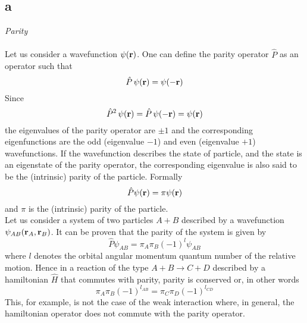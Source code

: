\subsection*{a} 

\vspace{10pt}
\emph{Parity} \\
\vspace{10pt} \\
Let us consider a wavefunction $\psi(\mathbf{r})$. One can define the parity operator $\hat P$ as an operator such that 
\begin{equation*}
    \hat P \, \psi(\mathbf{r}) = \psi(-\mathbf{r})
\end{equation*}
Since
\begin{equation}
    \hat P^2 \, \psi(\mathbf{r}) = \hat P \, \psi(-\mathbf{r}) = \psi(\mathbf{r})
    \label{eq:eigenvalue_equation_parity}
\end{equation}
the eigenvalues of the parity operator are $\pm 1$ and the corresponding eigenfunctions are the odd (eigenvalue $-1$) and even (eigenvalue $+1$) wavefunctions. If the wavefunction
describes the state of particle, and the state is an eigenstate of the parity operator, the corresponding eigenvalue is also said to be the (intrinsic) parity of the particle. Formally
\begin{equation*}
    \hat P \psi(\mathbf{r}) = \pi \psi(\mathbf{r})
\end{equation*}
and $\pi$ is the (intrinsic) parity of the particle. \\
Let us consider a system of two particles $A+B$ described by a wavefunction $\psi_{AB}(\mathbf{r}_A, \mathbf{r}_B)$. It can be proven that the parity of the system is given by 
\begin{equation*}
    \hat P \psi_{AB} = \pi_A \pi_B (-1)^l \psi_{AB}
\end{equation*}
where $l$ denotes the orbital angular momentum quantum number of the relative motion. Hence in a reaction of the type $A+B \rightarrow C+D$ described by a hamiltonian $\hat H$ that commutes with parity,
parity is conserved or, in other words
\begin{equation*}
    \pi_A \pi_B (-1)^{l_{AB}} = \pi_C \pi_D (-1)^{l_{CD}} 
\end{equation*}
This, for example, is not the case of the weak interaction where, in general, the hamiltonian operator does not commute with the parity operator. \\
\vspace{10pt} \\

